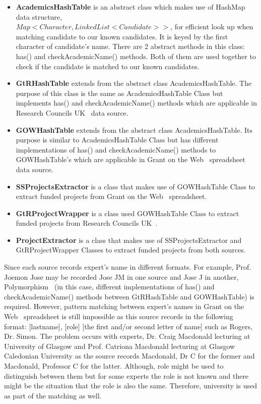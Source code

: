 \begin{itemize}
 \item \textbf{AcademicsHashTable} is an abstract class which makes use of HashMap data structure, \\ 
 $Map<Character, LinkedList<Candidate>>$, for efficient look up when matching candidate to our
known candidates. It is keyed by the first character of candidate's name. There are 2 abstract methods in this class: has() and checkAcademicName() methods.
Both of them are used together to check if the candidate is matched to our known candidates.
\item \textbf{GtRHashTable} extends from the abstract class AcademicsHashTable. The purpose of this class is the same as AcademicsHashTable Class but
implements has() and checkAcademicName() methods which are applicable in Research Councils UK~\cite{gtr} data source.
\item \textbf{GOWHashTable} extends from the abstract class AcademicsHashTable. Its purpose is similar to AcademicsHashTable Class but
has different implementations of has() and checkAcademicName() methods to GOWHashTable's which are applicable in Grant on the Web~\cite{gow} spreadsheet data source.
\item \textbf{SSProjectsExtractor} is a class that makes use of GOWHashTable Class to extract funded projects from Grant on the Web~\cite{gow} spreadsheet.
\item \textbf{GtRProjectWrapper} is a class used GOWHashTable Class to extract funded projects from Research Councils UK~\cite{gtr}.
\item \textbf{ProjectExtractor} is a class that makes use of SSProjectsExtractor and GtRProjectWrapper Classes to extract funded projects from both sources.
\end{itemize}

Since each source records expert's name in different formats. For example, Prof. Joemon Jose may be recorded Jose JM in one source and Jose J in another,
Polymorphism~\cite{polymorphism} (in this case, different implementations of has() and checkAcademicName() methods between GtRHashTable and GOWHashTable) is required.
However, pattern matching between
expert's names in Grant on the Web~\cite{gow} spreadsheet is still impossible as this source records in the following format: 
[lastname], [role] [the first and/or second letter of name] such as Rogers, Dr. Simon. The problem occurs with experts, Dr. Craig Macdonald lecturing at
University of Glasgow and Prof. Catriona Macdonald lecturing at Glasgow Caledonian University
as the source records Macdonald, Dr C for the former and Macdonald, Professor C for the latter. Although, role might be used to distinguish between them but
for some experts the role is not known and there might be the situation that the role is also the same. 
Therefore, university is used as part of the matching as well.

